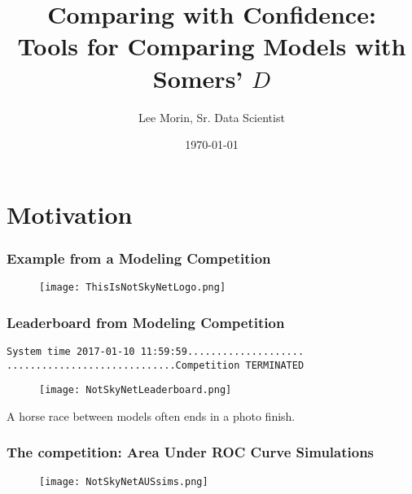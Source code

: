 \documentclass{beamer}
\title{Comparing with Confidence: \\
    Tools for Comparing Models with Somers’ $D$}
\author{Lee Morin, Sr. Data Scientist}
\institute[Capital One Canada]
{
    Canada Statistical Data Science \\
    \texttt{[image: C1\_Core\_2CG\_RGB.jpg]}
}
\date{\today}
\begin{document}

\frame{\titlepage}

\section[Outline]{}

\frame{\tableofcontents}




\section{Motivation}



\begin{frame}
\frametitle{Example from a Modeling Competition}

\begin{figure}
    \texttt{[image: ThisIsNotSkyNetLogo.png]}
\end{figure}

\end{frame}



\begin{frame}
\frametitle{Leaderboard from Modeling Competition}

\texttt{System time 2017-01-10 11:59:59....................\\
.............................Competition TERMINATED
}


\begin{figure}
    \texttt{[image: NotSkyNetLeaderboard.png]}
\end{figure}

A horse race between models often ends in a photo finish.

\end{frame}


\begin{frame}
\frametitle{The competition: Area Under ROC Curve Simulations}

\begin{figure}
    \texttt{[image: NotSkyNetAUSsims.png]} %
\end{figure}

\end{frame}
\end{document}
